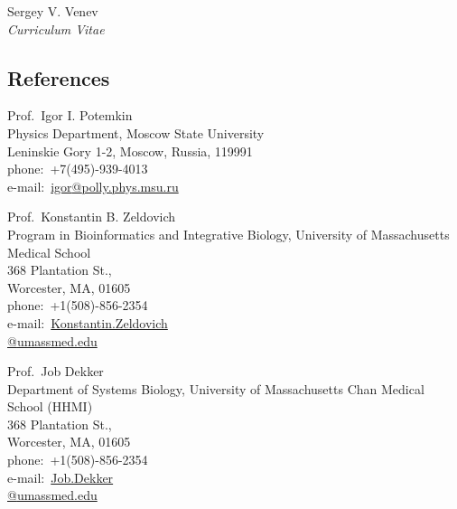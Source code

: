 \documentclass[10pt]{article}
\begin{document}
\begin{cv}{Sergey V. Venev\\{\large \itshape Curriculum Vitae}}
\subsection*{References}
\noindent\makebox[\linewidth]{\rule{\textwidth}{0.5pt}}
\vspace{0.1\baselineskip}
\begin{paracol}{3}

    Prof.\ Igor I. Potemkin\\
    Physics Department, Moscow State University\\
    Leninskie Gory 1-2, Moscow, Russia, 119991\\
    phone:\ +7(495)-939-4013\\
    e-mail:\ \href{mailto:igor@polly.phys.msu.ru}{igor\textrm{@}polly.phys.msu.ru}

\switchcolumn

    Prof.\ Konstantin B. Zeldovich\\
    Program in Bioinformatics and Integrative Biology, University of Massachusetts Medical School\\
    368 Plantation St.,\\ Worcester, MA, 01605\\
    phone:\ +1(508)-856-2354\\
    e-mail:\ \href{mailto:Konstantin.Zeldovich@umassmed.edu}{Konstantin.Zeldovich\\\textrm{@}umassmed.edu}

\switchcolumn

    Prof.\ Job Dekker\\
    Department of Systems Biology, University of Massachusetts Chan Medical School (HHMI)\\
    368 Plantation St.,\\ Worcester, MA, 01605\\
    phone:\ +1(508)-856-2354\\
    e-mail:\ \href{mailto:Job.Dekker@umassmed.edu}{Job.Dekker\\\textrm{@}umassmed.edu}



\end{paracol}




\end{cv}
\end{document}
